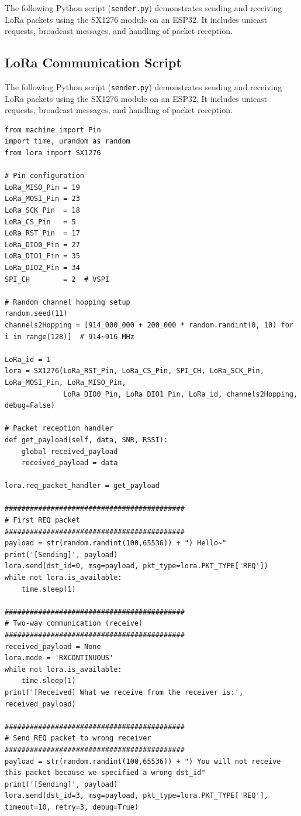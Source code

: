 The following Python script (\texttt{sender.py}) demonstrates sending and receiving LoRa packets using the SX1276 module on an ESP32. It includes unicast requests, broadcast messages, and handling of packet reception.

\subsection{LoRa Communication Script}

The following Python script (\texttt{sender.py}) demonstrates sending and receiving LoRa packets using the SX1276 module on an ESP32. It includes unicast requests, broadcast messages, and handling of packet reception.
{\scriptsize
\begin{verbatim}
from machine import Pin
import time, urandom as random
from lora import SX1276

# Pin configuration
LoRa_MISO_Pin = 19
LoRa_MOSI_Pin = 23
LoRa_SCK_Pin  = 18
LoRa_CS_Pin   = 5
LoRa_RST_Pin  = 17
LoRa_DIO0_Pin = 27
LoRa_DIO1_Pin = 35
LoRa_DIO2_Pin = 34
SPI_CH        = 2  # VSPI

# Random channel hopping setup
random.seed(11)
channels2Hopping = [914_000_000 + 200_000 * random.randint(0, 10) for i in range(128)]  # 914~916 MHz

LoRa_id = 1
lora = SX1276(LoRa_RST_Pin, LoRa_CS_Pin, SPI_CH, LoRa_SCK_Pin, LoRa_MOSI_Pin, LoRa_MISO_Pin,
              LoRa_DIO0_Pin, LoRa_DIO1_Pin, LoRa_id, channels2Hopping, debug=False)

# Packet reception handler
def get_payload(self, data, SNR, RSSI):
    global received_payload
    received_payload = data

lora.req_packet_handler = get_payload

###########################################
# First REQ packet
###########################################
payload = str(random.randint(100,65536)) + ") Hello~"
print('[Sending]', payload)
lora.send(dst_id=0, msg=payload, pkt_type=lora.PKT_TYPE['REQ'])
while not lora.is_available:
    time.sleep(1)

###########################################
# Two-way communication (receive)
###########################################
received_payload = None
lora.mode = 'RXCONTINUOUS'
while not lora.is_available:
    time.sleep(1)
print('[Received] What we receive from the receiver is:', received_payload)

###########################################
# Send REQ packet to wrong receiver
###########################################
payload = str(random.randint(100,65536)) + ") You will not receive this packet because we specified a wrong dst_id"
print('[Sending]', payload)
lora.send(dst_id=3, msg=payload, pkt_type=lora.PKT_TYPE['REQ'], timeout=10, retry=3, debug=True)


\end{verbatim}}
